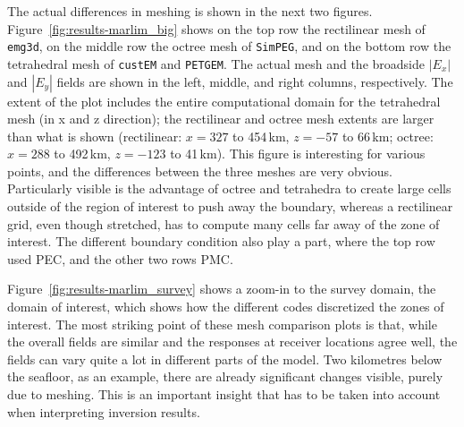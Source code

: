 \documentclass[
    paper,
  ]{geophysics}
\newcommand{\emg}[2]{\texttt{emg#1#2}\xspace}
\newcommand{\simpeg}{\texttt{SimPEG}\xspace}
\newcommand{\custem}{\texttt{custEM}\xspace}
\newcommand{\petgem}{\texttt{PETGEM}\xspace}
\begin{document}
The actual differences in meshing is shown in the next two figures. Figure~\ref{fig:results-marlim_big} shows on the top row the rectilinear mesh of \emg3d, on the middle row the octree mesh of \simpeg, and on the bottom row the tetrahedral mesh of \custem and \petgem. The actual mesh and the broadside $|E_x|$ and $|E_y|$ fields are shown in the left, middle, and right columns, respectively. The extent of the plot includes the entire computational domain for the tetrahedral mesh (in x and z direction); the rectilinear and octree mesh extents are larger than what is shown (rectilinear: $x=327$ to 454\,km, $z=-57$ to 66\,km; octree: $x=288$ to 492\,km, $z=-123$ to 41\,km).
%
%
This figure is interesting for various points, and the differences between the three meshes are very obvious. Particularly visible is the advantage of octree and tetrahedra to create large cells outside of the region of interest to push away the boundary, whereas a rectilinear grid, even though stretched, has to compute many cells far away of the zone of interest. The different boundary condition also play a part, where the top row used PEC, and the other two rows PMC.

Figure~\ref{fig:results-marlim_survey} shows a zoom-in to the survey domain, the domain of interest, which shows how the different codes discretized the zones of interest.
%
%
The most striking point of these mesh comparison plots is that, while the overall fields are similar and the responses at receiver locations agree well, the fields can vary quite a lot in different parts of the model. Two kilometres below the seafloor, as an example, there are already significant changes visible, purely due to meshing. This is an important insight that has to be taken into account when interpreting inversion results.
\end{document}
